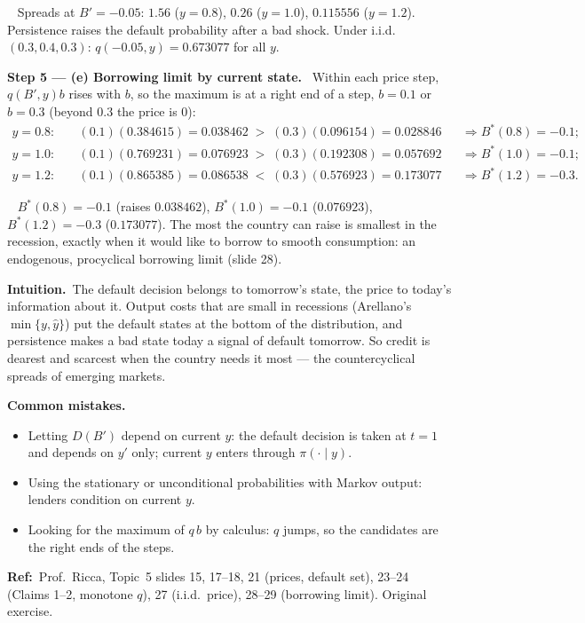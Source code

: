 \documentclass[11pt,a4paper]{article}
\newcommand{\step}[2]{\par\medskip\noindent\textbf{Step #1 --- #2.}~}
\newcommand{\intuition}{\par\medskip\noindent\textbf{Intuition.}~}
\newcommand{\refbib}{\par\smallskip\noindent\textbf{Ref:}~}
\newcommand{\answer}[1]{\par\smallskip\noindent\fbox{\textbf{Answer #1.}}~}
\newcommand{\pitfalls}{\par\medskip\noindent\textbf{Common mistakes.}}
\begin{document}
\answer{(d)} Spreads at $B'=-0.05$: $1.56$ ($y=0.8$), $0.26$ ($y=1.0$), $0.115556$ ($y=1.2$). Persistence raises the default probability after a bad
shock. Under i.i.d.\ $(0.3,0.4,0.3)$: $q(-0.05,y)=0.673077$ for all $y$.

\step{5}{(e) Borrowing limit by current state} Within each price step, $q(B',y)b$ rises with $b$, so the maximum is at a right end of a step,
$b=0.1$ or $b=0.3$ (beyond $0.3$ the price is $0$):
\begin{align}
  y=0.8:&\quad (0.1)(0.384615)=0.038462 \;>\; (0.3)(0.096154)=0.028846 &&\Rightarrow B^*(0.8)=-0.1; \nonumber\\
  y=1.0:&\quad (0.1)(0.769231)=0.076923 \;>\; (0.3)(0.192308)=0.057692 &&\Rightarrow B^*(1.0)=-0.1; \nonumber\\
  y=1.2:&\quad (0.1)(0.865385)=0.086538 \;<\; (0.3)(0.576923)=0.173077 &&\Rightarrow B^*(1.2)=-0.3. \nonumber
\end{align}

\answer{(e)} $B^*(0.8)=-0.1$ (raises $0.038462$), $B^*(1.0)=-0.1$ ($0.076923$), $B^*(1.2)=-0.3$ ($0.173077$). The most the country can raise is
smallest in the recession, exactly when it would like to borrow to smooth consumption: an endogenous, procyclical borrowing limit (slide 28).

\intuition The default decision belongs to tomorrow's state, the price to today's information about it. Output costs that are small in recessions
(Arellano's $\min\{y,\hat y\}$) put the default states at the bottom of the distribution, and persistence makes a bad state today a signal of
default tomorrow. So credit is dearest and scarcest when the country needs it most --- the countercyclical spreads of emerging markets.

\pitfalls
\begin{itemize}
  \item Letting $D(B')$ depend on current $y$: the default decision is taken at $t=1$ and depends on $y'$ only; current $y$ enters through $\pi(\cdot\mid y)$.
  \item Using the stationary or unconditional probabilities with Markov output: lenders condition on current $y$.
  \item Looking for the maximum of $q\,b$ by calculus: $q$ jumps, so the candidates are the right ends of the steps.
\end{itemize}

\refbib Prof.\ Ricca, Topic~5 slides 15, 17--18, 21 (prices, default set), 23--24 (Claims 1--2, monotone $q$), 27 (i.i.d.\ price), 28--29 (borrowing limit). Original exercise.
\end{document}
